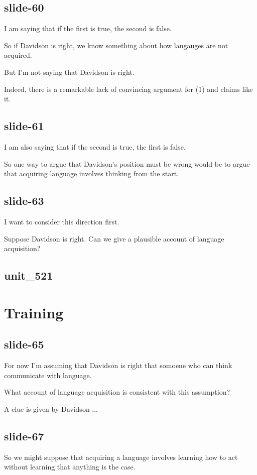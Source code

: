 \documentclass[12pt,\papersize]{extarticle}
\begin{document}
\subsection{slide-60}
I am saying that if the first is true, the second is false.
 
So if Davidson is right, we know something about how langauges are not acquired.
 
But I'm not saying that Davidson is right.
 
Indeed, there is a remarkable lack of convincing argument for (1) and claims like it.
 
\subsection{slide-61}
I am  also saying that if the second is true, the first is false.
 
So one way to argue that Davidson's position must be wrong would be to argue that acquiring language involves thinking from the start.
 
\subsection{slide-63}
I want to consider this direction first.
 
Suppose Davidson is right.  Can we give a plausible account of language acquisition?
 
\subsection{unit\_521}
 
 
\section{Training}
 
\subsection{slide-65}
For now I'm assuming that Davidson is right that somoene who can think communicate with language.
 
What account of language acquisition is consistent with this assumption?
 
A clue is given by Davidson ...
 
\subsection{slide-67}
So we might suppose that acquiring a language involves learning how to act without learning that anything is the case.
 
\end{document}

